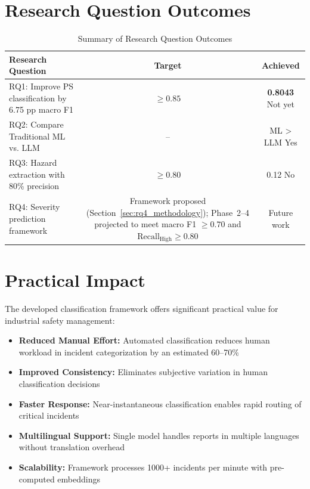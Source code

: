 \documentclass[11pt, titlepage, bibliography=totoc]{scrreprt}
\begin{document}
\section{Research Question Outcomes}

\begin{table}[htbp]
\centering
\caption{Summary of Research Question Outcomes}
\begin{tabular}{@{}p{8cm}cc@{}}
\toprule
\textbf{Research Question} & \textbf{Target} & \textbf{Achieved} \\
\midrule
RQ1: Improve PS classification by 6.75 pp macro F1 & $\geq 0.85$ & \textbf{0.8043} Not yet \\
RQ2: Compare Traditional ML vs. LLM & -- & ML > LLM Yes \\
RQ3: Hazard extraction with 80\% precision & $\geq 0.80$ & 0.12 No \\
RQ4: Severity prediction framework & Framework proposed (Section~\ref{sec:rq4_methodology}); Phase~2--4 projected to meet macro F1 $\geq 0.70$ and $\text{Recall}_\text{High} \geq 0.80$ & Future work \\
\bottomrule
\end{tabular}
\end{table}

\section{Practical Impact}

The developed classification framework offers significant practical value for industrial safety management:

\begin{itemize}
    \item \textbf{Reduced Manual Effort:} Automated classification reduces human workload in incident categorization by an estimated 60--70\%
    \item \textbf{Improved Consistency:} Eliminates subjective variation in human classification decisions
    \item \textbf{Faster Response:} Near-instantaneous classification enables rapid routing of critical incidents
    \item \textbf{Multilingual Support:} Single model handles reports in multiple languages without translation overhead
    \item \textbf{Scalability:} Framework processes 1000+ incidents per minute with pre-computed embeddings
\end{itemize}
\end{document}
